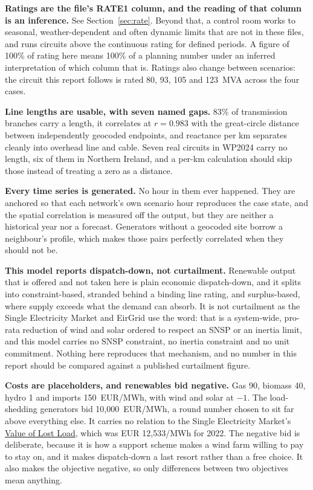 \documentclass[11pt,a4paper]{article}
\begin{document}
\textbf{Ratings are the file's RATE1 column, and the reading of that column is
an inference.} See Section~\ref{sec:rate}. Beyond that, a control room works to
seasonal, weather-dependent and often dynamic limits that are not in these
files, and runs circuits above the continuous rating for defined periods. A
figure of 100\% of rating here means 100\% of a planning number under an
inferred interpretation of which column that is. Ratings also change between
scenarios: the circuit this report follows is rated 80, 93, 105 and 123~MVA
across the four cases.

\textbf{Line lengths are usable, with seven named gaps.} 83\% of transmission
branches carry a length, it correlates at $r = 0.983$ with the great-circle
distance between independently geocoded endpoints, and reactance per km
separates cleanly into overhead line and cable. Seven real circuits in WP2024
carry no length, six of them in Northern Ireland, and a per-km calculation
should skip those instead of treating a zero as a distance.

\textbf{Every time series is generated.} No hour in them ever happened. They
are anchored so that each network's own scenario hour reproduces the case
state, and the spatial correlation is measured off the output, but they are
neither a historical year nor a forecast. Generators
without a geocoded site borrow a neighbour's profile, which makes those pairs
perfectly correlated when they should not be.

\textbf{This model reports dispatch-down, not curtailment.} Renewable output
that is offered and not taken here is plain economic dispatch-down, and it
splits into constraint-based, stranded behind a binding line rating, and
surplus-based, where supply exceeds what the demand can absorb. It is not
curtailment as the Single Electricity Market and EirGrid use the word: that is
a system-wide, pro-rata reduction of wind and solar ordered to respect an SNSP
or an inertia limit, and this model carries no SNSP constraint, no inertia
constraint and no unit commitment. Nothing here reproduces that mechanism, and
no number in this report should be compared against a published curtailment
figure.

\textbf{Costs are placeholders, and renewables bid negative.} Gas 90, biomass
40, hydro 1 and imports 150~EUR/MWh, with wind and solar at $-1$. The
load-shedding generators bid 10{,}000~EUR/MWh, a round number chosen to sit far
above everything else. It carries no relation to the Single Electricity
Market's \href{https://www.semcommittee.com/publications/sem-23-072-calculation-single-value-lost-load-within-single-electricity-market}{Value of Lost Load}, which was EUR 12{,}533/MWh for 2022.
The negative bid is deliberate, because it is how a support scheme makes a wind
farm willing to pay to stay on, and it makes dispatch-down a last resort
rather than a free choice. It also makes the objective negative, so only differences
between two objectives mean anything.
\end{document}
